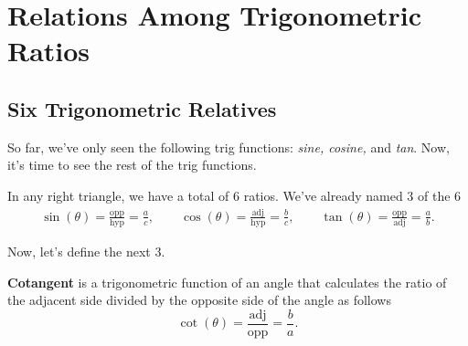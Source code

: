 \chapter{Relations Among Trigonometric Ratios}
\label{chap:relations_among_trigonometric_ratios}

\section{Six Trigonometric Relatives}
\label{sec:six_trigonometric_relatives}

So far, we've only seen the following trig functions: \textit{sine, cosine,}
and \textit{tan}. Now, it's time to see the rest of the trig functions.

\begin{figure}[htpb]
	\centering


	\label{fig:right_triangle_named_on_all_sides_using_symbols_and_text}
\end{figure}

In any right triangle, we have a total of $6$ ratios. We've already named $3$ of the $6$
\begin{align*}
	\sin(\theta) = \frac{\textrm{opp}}{\textrm{hyp}} = \frac{a}{c}, \qquad \cos(\theta) = \frac{\textrm{adj}}{\textrm{hyp}} = \frac{b}{c}, \qquad \tan(\theta) = \frac{\textrm{opp}}{\textrm{adj}} = \frac{a}{b}
	.\end{align*}

Now, let's define the next $3$.

\begin{definition}[Cotangent]
	\label{def:cotangent}

	\textbf{Cotangent} is a trigonometric function of an angle that calculates
	the ratio of the adjacent side divided by the opposite side of the angle as
	follows
	\[%
		\cot(\theta) = \frac{\textrm{adj}}{\textrm{opp}} = \frac{b}{a}
  .\]%
\end{definition}

